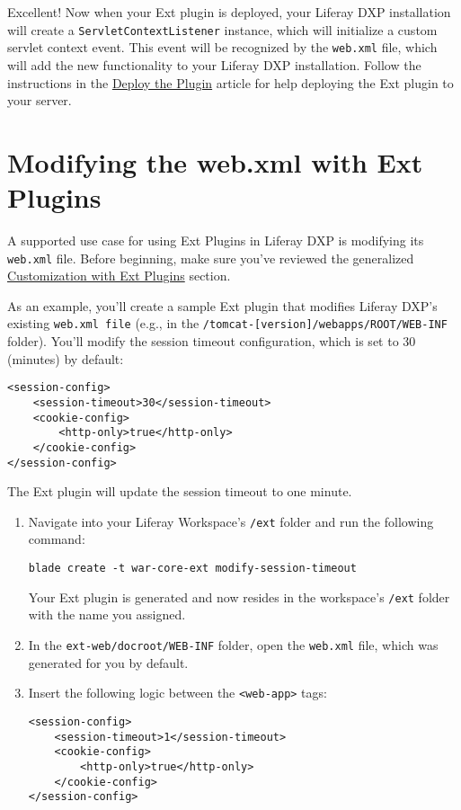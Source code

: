 Excellent! Now when your Ext plugin is deployed, your Liferay DXP
installation will create a \texttt{ServletContextListener} instance,
which will initialize a custom servlet context event. This event will be
recognized by the \texttt{web.xml} file, which will add the new
functionality to your Liferay DXP installation. Follow the instructions
in the
\href{/docs/7-2/customization/-/knowledge_base/c/deploying-an-ext-plugin}{Deploy
the Plugin} article for help deploying the Ext plugin to your server.

\chapter{Modifying the web.xml with Ext
Plugins}\label{modifying-the-web.xml-with-ext-plugins}

A supported use case for using Ext Plugins in Liferay DXP is modifying
its \texttt{web.xml} file. Before beginning, make sure you've reviewed
the generalized
\href{/docs/7-2/customization/-/knowledge_base/c/customizing-core-functionality-with-ext}{Customization
with Ext Plugins} section.

As an example, you'll create a sample Ext plugin that modifies Liferay
DXP's existing \texttt{web.xml\ file} (e.g., in the
\texttt{/tomcat-{[}version{]}/webapps/ROOT/WEB-INF} folder). You'll
modify the session timeout configuration, which is set to 30 (minutes)
by default:

\begin{verbatim}
<session-config>
    <session-timeout>30</session-timeout>
    <cookie-config>
        <http-only>true</http-only>
    </cookie-config>
</session-config>
\end{verbatim}

The Ext plugin will update the session timeout to one minute.

\begin{enumerate}
\def\labelenumi{\arabic{enumi}.}
\item
  Navigate into your Liferay Workspace's \texttt{/ext} folder and run
  the following command:

\begin{verbatim}
blade create -t war-core-ext modify-session-timeout
\end{verbatim}

  Your Ext plugin is generated and now resides in the workspace's
  \texttt{/ext} folder with the name you assigned.
\item
  In the \texttt{ext-web/docroot/WEB-INF} folder, open the
  \texttt{web.xml} file, which was generated for you by default.
\item
  Insert the following logic between the
  \texttt{\textless{}web-app\textgreater{}} tags:

\begin{verbatim}
<session-config>
    <session-timeout>1</session-timeout>
    <cookie-config>
        <http-only>true</http-only>
    </cookie-config>
</session-config>
\end{verbatim}
\end{enumerate}

